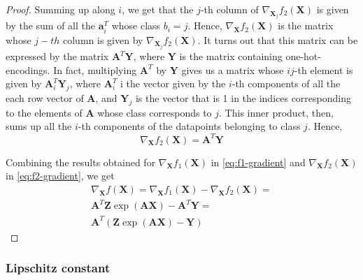 \documentclass[12pt]{article}
\newcommand{\boldX}{\mathbf{X}}
\begin{document}
\begin{proof}
Summing up along $i$, we get that the $j$-th column of $\nabla_{\boldX_j} f_2(\boldX)$ is given by the sum of all the $\mathbf{a}_i^T$ whose class $b_i = j$. Hence, $\nabla_{\boldX} f_2(\boldX)$ is the matrix whose $j-th$ column is given by $\nabla_{\boldX_j} f_2(\boldX)$. It turns out that this matrix can be expressed by the matrix $\mathbf{A}^T \mathbf{Y}$, where $\mathbf{Y}$ is the matrix containing one-hot-encodings. In fact, multiplying $\mathbf{A}^T$ by $\mathbf{Y}$ gives us a matrix whose $ij$-th element is given by $\mathbf{A}_i^T \mathbf{Y}_j$, where $\mathbf{A}_i^T$ i the vector given by the $i$-th components of all the each row vector of $\mathbf{A}$, and $ \mathbf{Y}_j$ is the vector that is 1 in the indices corresponding to the elements of $\mathbf{A}$ whose class corresponds to $j$. This inner product, then, sums up all the $i$-th components of the datapoints belonging to class $j$. Hence,
\begin{equation} \label{eq:f2-gradient}
    \nabla_{\boldX} f_2(\boldX) = \mathbf{A}^T \mathbf{Y}
\end{equation}

Combining the results obtained for $\nabla_{\boldX} f_1(\boldX)$ in \eqref{eq:f1-gradient} and $\nabla_{\boldX} f_2(\boldX)$ in \eqref{eq:f2-gradient}, we get
\begin{gather}
    \nabla_{\boldX} f(\boldX) = \nabla_{\boldX} f_1(\boldX) - \nabla_{\boldX} f_2(\boldX) = \\
    \mathbf{A}^T \mathbf{Z} \exp{(\mathbf{A}\mathbf{X})} - \mathbf{A}^T \mathbf{Y} = \\
    \mathbf{A}^T (\mathbf{Z} \exp{(\mathbf{A}\mathbf{X})} - \mathbf{Y})
\end{gather}

\end{proof}


\subsubsection{Lipschitz constant}
\end{document}
